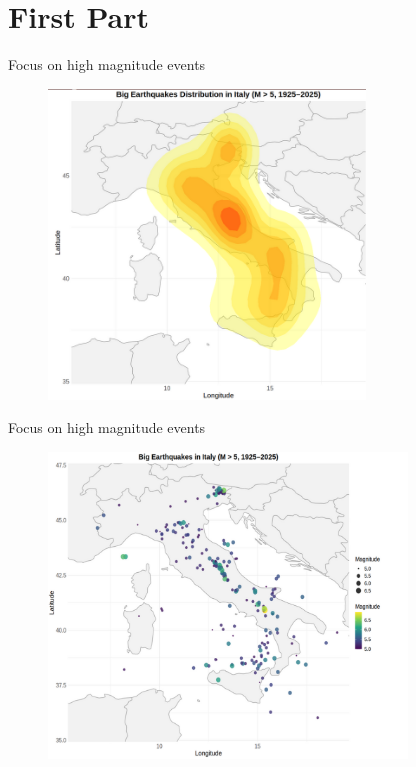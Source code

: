 \documentclass[aspectratio=43]{beamer}
\begin{document}
\section{First Part}

\begin{frame}{Focus on high magnitude events}
	\begin{figure}[h]
		\centering
		\includegraphics[width=0.75\textwidth]{EQ_images_ben/eq_density_map.png}
	\end{figure}
\end{frame}

\begin{frame}{Focus on high magnitude events}
	\begin{figure}[h]
		\centering
		\includegraphics[width=0.85\textwidth]{EQ_images_ben/eq_map_italy.png}
	\end{figure}
\end{frame}
\end{document}
